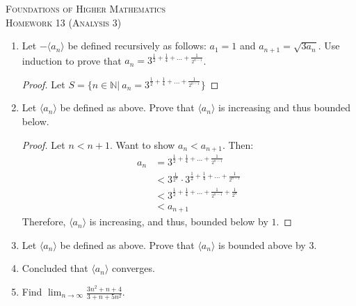 \documentclass{article}
\theoremstyle{problem}
\theoremstyle{plain}
\theoremstyle{remark}
\begin{document}
\begin{center}
  \textsc{\Large Foundations of Higher Mathematics}\\[.3cm]
  \textsc{\Large Homework 13 (Analysis 3)}
\end{center}

\begin{enumerate}
\item Let $-\langle a_n \rangle$ be defined recursively as follows: $a_1 = 1$ and $a_{n+1} = \sqrt{3a_n}$. Use induction to prove that $a_n = 3^{\frac{1}{2} + \frac{1}{4} + \ldots + \frac{1}{2^{n-1}}}$.
\begin{proof}
  Let $S = \{n \in \mathbb N|\ a_n = 3^{\frac{1}{2} + \frac{1}{4} + \ldots + \frac{1}{2^{n-1}}}\}$
\end{proof}
\item Let $\langle a_n \rangle$ be defined as above. Prove that $\langle a_n \rangle$ is increasing and thus bounded below.
\begin{proof}
  Let $n < n + 1$. Want to show $a_n < a_{n+1}$. Then:
\begin{align*}
  a_n &= 3^{\frac{1}{2} + \frac{1}{4} + \ldots + \frac{1}{2^{n-1}}}\\
  &< 3^{\frac{1}{2^n}} \cdot 3^{\frac{1}{2} + \frac{1}{4} + \ldots + \frac{1}{2^{n-1}}}\\
  &< 3^{\frac{1}{2} + \frac{1}{4} + \ldots + \frac{1}{2^{n-1}} + \frac{1}{2^n}}\\
  &< a_{n+1}
\end{align*}
Therefore, $\langle a_n \rangle$ is increasing, and thus,
bounded below by $1$.
\end{proof}
\item Let $\langle a_n \rangle$ be defined as above. Prove that $\langle a_n \rangle$ is bounded above by 3.
\item Concluded that $\langle a_n \rangle$ converges.
\item Find $\displaystyle \lim_{n \to \infty} \frac{3n^2+n+4}{3 + n + 5n^2}$.
\end{enumerate}
\end{document}
